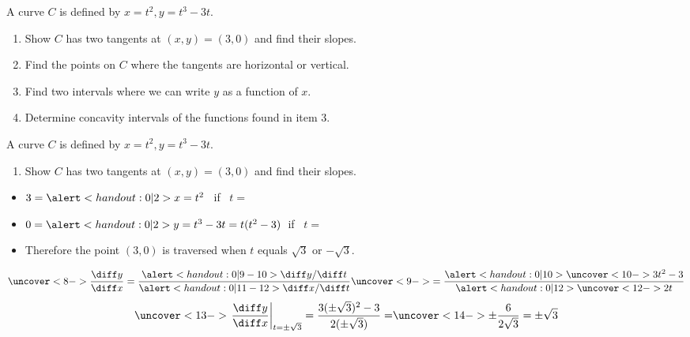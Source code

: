 \begin{frame}[t]
\begin{example}
A curve $C$ is defined by $x = t^2, y = t^3 - 3t$.
\begin{enumerate}
\item  Show $C$ has two tangents at $(x,y)=(3,0)$ and find their slopes.
\item  Find the points on $C$ where the tangents are horizontal or vertical.
\item  Find two intervals where we can write $y$ as a function of $x$.
\item  Determine concavity intervals of the functions found in item 3.
\end{enumerate}
\end{example}
\end{frame}




\begin{frame}[t]
\begin{example}
A curve $C$ is defined by \alert<handout:0| 2>{$x = t^2, y = t^3 - 3t$}.
\begin{enumerate}
\item  Show $C$ has two tangents at $(x,y)=(3,0)$ and find their slopes.
\end{enumerate}
\begin{itemize}
\item<2-| alert@3-4>  $3 = \alert<handout:0| 2>{x = t^2}$ \ if \ $t = $ 
\item<2-| alert@5-6>  $0 = \alert<handout:0| 2>{y = t^3 - 3t} = t(t^2-3)$\  if \ $t = $ 
\item<7->  Therefore the point $(3,0)$ is traversed when $t$ equals $\sqrt{3}$ or $-\sqrt{3}$.
\end{itemize}
\abovedisplayskip=0pt
\belowdisplayskip=0pt
\[
\uncover<8->{%
\frac{\diff y}{\diff x} = \frac{\alert<handout:0| 9-10>{\diff y / \diff t}}{\alert<handout:0| 11-12>{\diff x / \diff t}} %
}%
\uncover<9->{%
 = \frac{\alert<handout:0| 10>{\uncover<10->{3t^2-3 }}}{\alert<handout:0| 12>{\uncover<12->{2t }}}%
}%
\]
%
\abovedisplayskip=0pt
\belowdisplayskip=0pt
\[
\uncover<13->{%
\left. \frac{\diff y}{\diff x} \right|_{t = \pm \sqrt{3}} = \frac{3(\pm \sqrt{3})^2 - 3}{2(\pm \sqrt{3})} = %
}%
\uncover<14->{%
\pm \frac{6}{2\sqrt{3}} = \pm \sqrt{3}%
}%
\]
%
\end{example}
\end{frame}



